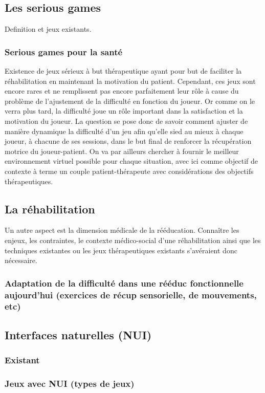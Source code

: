 	\subsection{Les serious games}
Definition et jeux existants.	
		\subsubsection{Serious games pour la santé}
Existence de jeux sérieux à but thérapeutique ayant pour but de faciliter la réhabilitation en maintenant la motivation du patient. Cependant, ces jeux sont encore rares et ne remplissent pas encore parfaitement leur rôle à cause du problème de l'ajustement de la difficulté en fonction du joueur.
Or comme on le verra plus tard, la difficulté joue un rôle important dans la satisfaction et la motivation du joueur. La question se pose donc de savoir comment ajuster de manière dynamique la difficulté d'un jeu afin qu'elle sied au mieux à chaque joueur, à chacune de ses sessions, dans le but final de renforcer la récupération motrice du joueur-patient. On va par ailleurs chercher à fournir le meilleur environnement virtuel possible pour chaque situation, avec ici comme objectif de contexte à terme un couple patient-thérapeute avec considérations des objectifs thérapeutiques. 		
	\subsection{La réhabilitation}
Un autre aspect est la dimension médicale de la rééducation. Connaître les enjeux, les contraintes, le contexte médico-social d'une réhabilitation ainsi que les techniques existantes ou les jeux thérapeutiques existants s'avéraient donc nécessaire.
	
		\subsubsection{Adaptation de la difficulté dans une rééduc fonctionnelle aujourd'hui (exercices de récup sensorielle, de mouvements, etc)}
		
		
	\subsection{Interfaces naturelles (NUI)}
		\subsubsection{Existant}
		
		\subsubsection{Jeux avec NUI (types de jeux)}
		
